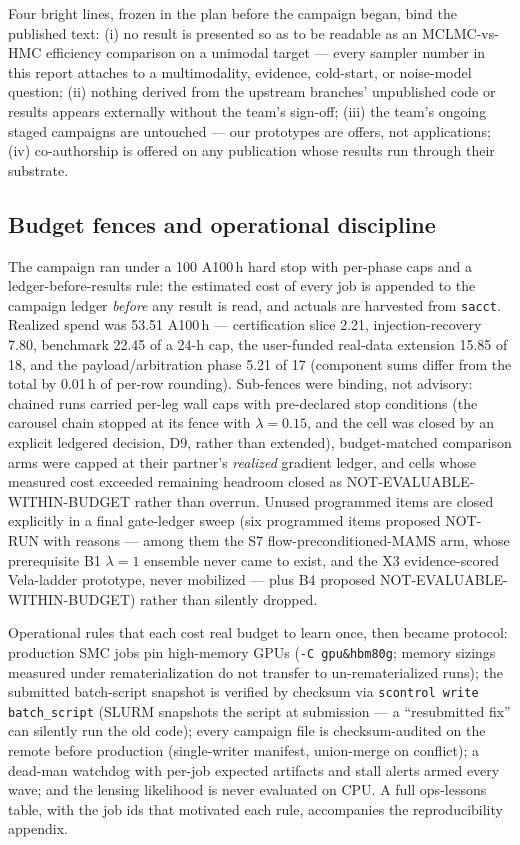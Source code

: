 Four bright lines, frozen in the plan before the campaign began, bind the
published text: (i) no result is presented so as to be readable as an
MCLMC-vs-HMC efficiency comparison on a unimodal target --- every sampler
number in this report attaches to a multimodality, evidence, cold-start,
or noise-model question; (ii) nothing derived from the upstream branches'
unpublished code or results appears externally without the team's
sign-off; (iii) the team's ongoing staged campaigns are untouched --- our
prototypes are offers, not applications; (iv) co-authorship is offered on
any publication whose results run through their substrate.

\subsection{Budget fences and operational discipline}

The campaign ran under a 100 A100\,h hard stop with per-phase caps and a
ledger-before-results rule: the estimated cost of every job is appended to
the campaign ledger \emph{before} any result is read, and actuals are
harvested from \texttt{sacct}. Realized spend was 53.51 A100\,h ---
certification slice 2.21, injection-recovery 7.80, benchmark 22.45 of a
24-h cap, the user-funded real-data extension 15.85 of 18, and the
payload/arbitration phase 5.21 of 17 (component sums differ from the
total by 0.01\,h of per-row rounding). Sub-fences were binding, not advisory: chained runs carried
per-leg wall caps with pre-declared stop conditions (the carousel chain
stopped at its fence with $\lambda=0.15$, and the cell was closed by an
explicit ledgered decision, D9, rather than extended), budget-matched
comparison arms were
capped at their partner's \emph{realized} gradient ledger, and cells
whose measured cost exceeded remaining headroom closed as
NOT-EVALUABLE-WITHIN-BUDGET rather than overrun. Unused programmed items
are closed explicitly in a final gate-ledger sweep (six programmed items
proposed NOT-RUN with reasons --- among them the S7
flow-preconditioned-MAMS arm, whose prerequisite B1 $\lambda{=}1$
ensemble never came to exist, and the X3 evidence-scored Vela-ladder
prototype, never mobilized --- plus B4 proposed
NOT-EVALUABLE-WITHIN-BUDGET) rather than silently
dropped.

Operational rules that each cost real budget to learn once, then became
protocol: production SMC jobs pin high-memory GPUs (\texttt{-C
gpu\&hbm80g}; memory sizings measured under rematerialization do not
transfer to un-rematerialized runs); the submitted batch-script snapshot
is verified by checksum via \texttt{scontrol write batch\_script} (SLURM
snapshots the script at submission --- a ``resubmitted fix'' can silently
run the old code); every campaign file is checksum-audited on the remote
before production (single-writer manifest, union-merge on conflict); a
dead-man watchdog with per-job expected artifacts and stall alerts armed
every wave; and the lensing likelihood is never evaluated on CPU. A full
ops-lessons table, with the job ids that motivated each rule, accompanies
the reproducibility appendix.

